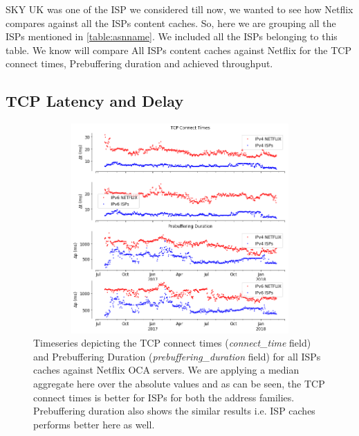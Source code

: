 SKY UK was one of the ISP we considered till now, we wanted to see how Netflix compares against all the ISPs content caches. So, here we are grouping all the ISPs mentioned in  \cref{table:asnname}.
We included all the ISPs belonging to this table. We know will compare All ISPs content caches against Netflix for the TCP connect times, Prebuffering duration and achieved throughput.

\subsection*{TCP Latency and Delay}

\begin{figure}[!ht]
	\centering
	\includegraphics[keepaspectratio, height=8cm, width=15cm]{figures/cache/allisps/netflix-tcp-pd-delay-timeseries-all-isps-separate.png}
	\caption[All ISPs TCP Connect Times and Pre-Buffering Duration Timeseries Absolute]{Timeseries depicting the TCP connect times (\textit{connect\_time} field) and Prebuffering Duration (\textit{prebuffering\_duration} field) for all ISPs caches against Netflix OCA servers. 
	We are applying a median aggregate here over the absolute values and as can be seen, the TCP connect times is better for ISPs for both the address families. Prebuffering duration also shows the similar
	results i.e. ISP caches performs better here as well.}
	\label{fig:All ISPs TCP Connect Times and Pre-Buffering Duration Timeseries Absolute}
\end{figure}

